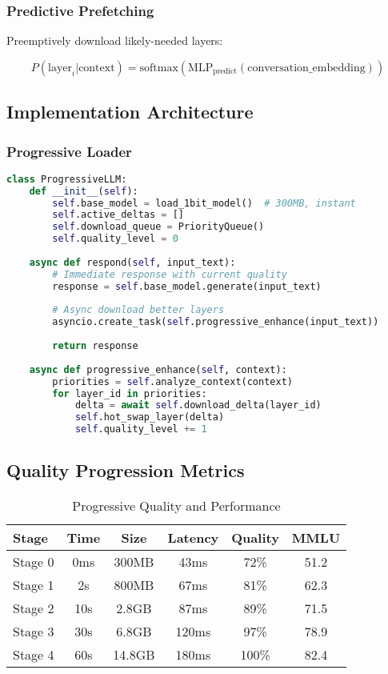 \subsubsection{Predictive Prefetching}

Preemptively download likely-needed layers:

\begin{equation}
P(\text{layer}_i | \text{context}) = \text{softmax}(\text{MLP}_{\text{predict}}(\text{conversation\_embedding}))
\end{equation}

\subsection{Implementation Architecture}

\subsubsection{Progressive Loader}
\begin{lstlisting}[language=Python, basicstyle=\small\ttfamily]
class ProgressiveLLM:
    def __init__(self):
        self.base_model = load_1bit_model()  # 300MB, instant
        self.active_deltas = []
        self.download_queue = PriorityQueue()
        self.quality_level = 0
        
    async def respond(self, input_text):
        # Immediate response with current quality
        response = self.base_model.generate(input_text)
        
        # Async download better layers
        asyncio.create_task(self.progressive_enhance(input_text))
        
        return response
    
    async def progressive_enhance(self, context):
        priorities = self.analyze_context(context)
        for layer_id in priorities:
            delta = await self.download_delta(layer_id)
            self.hot_swap_layer(delta)
            self.quality_level += 1
\end{lstlisting}

\subsection{Quality Progression Metrics}

\begin{table}[h]
\centering
\caption{Progressive Quality and Performance}
\begin{tabular}{lccccc}
\hline
\textbf{Stage} & \textbf{Time} & \textbf{Size} & \textbf{Latency} & \textbf{Quality} & \textbf{MMLU} \\
\hline
Stage 0 & 0ms & 300MB & 43ms & 72\% & 51.2 \\
Stage 1 & 2s & 800MB & 67ms & 81\% & 62.3 \\
Stage 2 & 10s & 2.8GB & 87ms & 89\% & 71.5 \\
Stage 3 & 30s & 6.8GB & 120ms & 97\% & 78.9 \\
Stage 4 & 60s & 14.8GB & 180ms & 100\% & 82.4 \\
\hline
\end{tabular}
\end{table}

